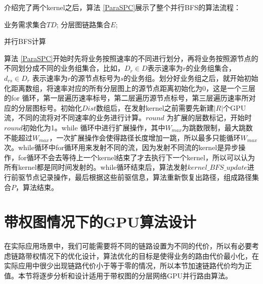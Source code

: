 介绍完了两个kernel之后，算法 \ref{ParaSPC}展示了整个并行BFS的算法流程：
\begin{algorithm}[t]
\begin{algorithmic}[1]
\Require
业务需求集合$TD$;
分层图链路集合$E$;
\Else
{}
\EndIf
{}
\EndFor
\EndFor
\EndFor
\EndFor
{}
\EndFor
{}
\EndWhile
{}
\EndFor
{}
\end{algorithmic}
\caption{{并行BFS计算}}
\label{ParaSPC}
\end{algorithm}
算法 \ref{ParaSPC}开始时先将业务按照速率的不同进行划分，再将业务按照源节点的不同划分成不同的业务组集合，比如，$D_r \in D$表示速率为$r$的业务组集合，$d_{rs} \in D_r$ 表示速率为$r$的源节点标号为$s$的业务组。划分好业务组之后，就开始初始化距离数组，将速率对应的所有分层图上的源节点距离初始化为0，这是一个三层的for 循环，第一层遍历速率标号，第二层遍历源节点标号，第三层遍历速率所对应的分层图标号。初始化$Dist$数组后，在发射kernel之前需要先新建$|R|$个GPU流，不同的流将对不同速率的业务进行计算。$round$ 为扩展的层数标记，开始时$round$初始化为1。while 循环中进行扩展操作，其中$W_{max}$为跳数限制，最大跳数不能超过$W_{max}$，一次扩展操作会使得路径长度增加一跳，所以最多只能循环$W_{max}$次。while循环中for循环用来发射不同的流，因为发射不同流的kernel是异步操作，for循环不会去等待上一个kernel结束了才去执行下一个kernel，所以可以认为所有kernel都是同时间发射的。while循环结束后，算法发射$kernel\_BFS\_update$进行前驱节点记录操作，最后根据这些前驱信息，算法重新恢复出路径，组成路径集合$P$，算法结束。
\section{带权图情况下的GPU算法设计}

在实际应用场景中，我们可能需要将不同的链路设置为不同的代价，所以有必要考虑链路带权情况下的优化设计，算法优化的目标是使得业务的路由代价最小化，在实际应用中很少出现链路代价小于等于零的情况，所以本节加速链路代价均为正值。本节将逐步分析和设计适用于带权图的分层网络GPU并行路由算法。
